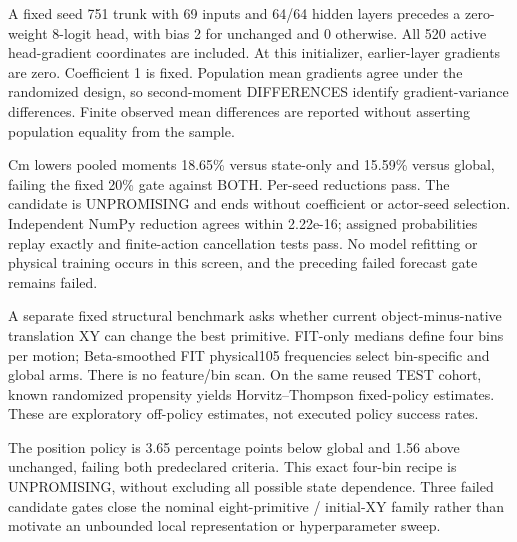 \documentclass[10pt]{article}
\begin{document}
A fixed seed 751 trunk with 69 inputs and 64/64 hidden layers precedes a zero-weight
8-logit head, with bias 2 for unchanged and 0 otherwise. All 520 active head-gradient
coordinates are included. At this initializer, earlier-layer gradients are zero.
Coefficient 1 is fixed. Population mean gradients agree under the randomized design,
so second-moment DIFFERENCES identify gradient-variance differences. Finite observed
mean differences are reported without asserting population equality from the sample.

\begin{table}[h]
\centering

\caption{Full-gradient squared-norm means from 1536 reused rows. Absolute second moments are not themselves identified gradient variance or policy utility.}
\end{table}

Cm lowers pooled moments 18.65\% versus state-only and 15.59\% versus global, failing
the fixed 20\% gate against BOTH. Per-seed reductions pass. The candidate is
UNPROMISING and ends without coefficient or actor-seed selection. Independent
NumPy reduction agrees within 2.22e-16; assigned probabilities replay exactly and
finite-action cancellation tests pass. No model refitting or physical training
occurs in this screen, and the preceding failed forecast gate remains failed.

A separate fixed structural benchmark asks whether current object-minus-native
translation XY can change the best primitive. FIT-only medians define four bins
per motion; Beta-smoothed FIT physical105 frequencies select bin-specific and
global arms. There is no feature/bin scan. On the same reused TEST cohort,
known randomized propensity yields Horvitz--Thompson fixed-policy estimates.
These are exploratory off-policy estimates, not executed policy success rates.

\begin{table}[h]
\centering

\caption{Position-bin headroom screen. All three motions and complete test cohorts retained; reported IPW estimates do not establish executed or learned-policy gains.}
\end{table}

The position policy is 3.65 percentage points below global and 1.56 above unchanged,
failing both predeclared criteria. This exact four-bin recipe is UNPROMISING,
without excluding all possible state dependence. Three failed candidate gates
close the nominal eight-primitive / initial-XY family rather than motivate an
unbounded local representation or hyperparameter sweep.
\end{document}
